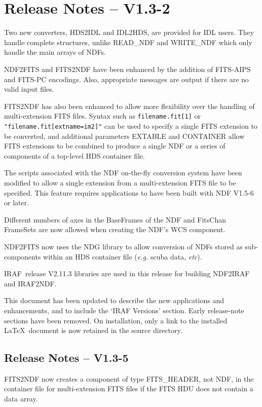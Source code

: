 \documentclass[twoside,11pt]{article}
\newcommand{\htmladdnormallink}[2]{#1}
\newcommand{\htmlref}[2]{#1}
\newcommand{\xref}[3]{#1}
\newcommand{\IRAF}{{\footnotesize IRAF}}
\newcommand{\IRAFURL}{http://star-www.rl.ac.uk/iraf/web/iraf-homepage.html}
\newcommand{\IRAFref}{\htmladdnormallink{\IRAF}{\IRAFURL}}
\begin{document}
\section{Release Notes -- V1.3-2}
Two new converters, 
\htmlref{HDS2IDL}{HDS2IDL}
and
\htmlref{IDL2HDS}{IDL2HDS},
are provided for IDL users. They handle complete structures, unlike 
\htmlref{READ\_NDF}{READ_NDF}
and
\htmlref{WRITE\_NDF}{WRITE_NDF}
which only handle the main arrays of NDFs. 

\htmlref{NDF2FITS}{NDF2FITS}
and
\htmlref{FITS2NDF}{FITS2NDF}
have been enhanced by the addition of FITS-AIPS and FITS-PC encodings. Also,
appropriate messages are  output if there are no valid input files.

\htmlref{FITS2NDF}{FITS2NDF}
has also been enhanced to allow more flexibility over the handling of
multi-extension FITS files. Syntax such as \texttt{filename.fit[1]} or
\texttt{"filename.fit[extname=im2]"} can be used to specify a single FITS
extension to be converted, and additional parameters EXTABLE and CONTAINER
allow FITS extensions to be combined to produce a single NDF or a series of
components of a top-level HDS container file.

The scripts associated with the NDF on-the-fly conversion system have been
modified to allow a single extension from a multi-extension FITS file to be
specified.  This feature requires applications to have been built with NDF 
V1.5-6 or later.

Different numbers of axes in the  BaseFrames of the NDF and FitsChan FrameSets
are now allowed when creating the NDF's WCS component.

\htmlref{NDF2FITS}{NDF2FITS} now uses the 
\xref{NDG}{sun2}{}
library to allow conversion of NDFs stored as sub-components within an 
HDS container file (\textit{e.g.} scuba data, \textit{etc}).

\IRAFref\ release V2.11.3 libraries are used in this release for building
\htmlref{NDF2IRAF}{NDF2IRAF}
and
\htmlref{IRAF2NDF}{IRAF2NDF}.

This document has been updated to describe the new applications and
enhancements, and to include the
\htmlref{`{\small IRAF} Versions' section}{iraf_versions}.
Early release-note sections have been removed.
On installation, only a link to the installed \LaTeX\ document is now retained
in the source directory.

\subsection{Release Notes -- V1.3-5}
\htmlref{FITS2NDF}{FITS2NDF}
now creates a component of type FITS\_HEADER, not NDF, in the container
file for multi-extension FITS files if the FITS HDU does not contain a data
array.
\end{document}
